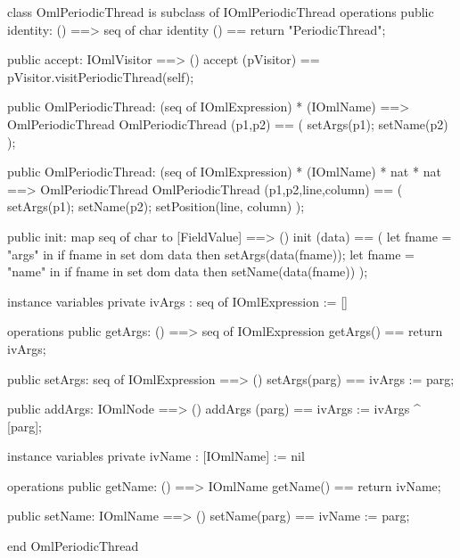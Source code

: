 \begin{vdm_al}
class OmlPeriodicThread is subclass of IOmlPeriodicThread
operations
  public identity: () ==> seq of char
  identity () == return "PeriodicThread";

  public accept: IOmlVisitor ==> ()
  accept (pVisitor) == pVisitor.visitPeriodicThread(self);

  public OmlPeriodicThread:
    (seq of IOmlExpression) *
    (IOmlName) ==> OmlPeriodicThread
  OmlPeriodicThread (p1,p2) == 
    ( setArgs(p1);
      setName(p2) );

  public OmlPeriodicThread:
    (seq of IOmlExpression) *
    (IOmlName) *
    nat *
    nat ==> OmlPeriodicThread
  OmlPeriodicThread (p1,p2,line,column) == 
    ( setArgs(p1);
      setName(p2);
      setPosition(line, column) );

  public init: map seq of char to [FieldValue] ==> ()
  init (data) ==
    ( let fname = "args" in
        if fname in set dom data
        then setArgs(data(fname));
      let fname = "name" in
        if fname in set dom data
        then setName(data(fname)) );

instance variables
  private ivArgs : seq of IOmlExpression := []

operations
  public getArgs: () ==> seq of IOmlExpression
  getArgs() == return ivArgs;

  public setArgs: seq of IOmlExpression ==> ()
  setArgs(parg) == ivArgs := parg;

  public addArgs: IOmlNode ==> ()
  addArgs (parg) == ivArgs := ivArgs ^ [parg];

instance variables
  private ivName : [IOmlName] := nil

operations
  public getName: () ==> IOmlName
  getName() == return ivName;

  public setName: IOmlName ==> ()
  setName(parg) == ivName := parg;

end OmlPeriodicThread
\end{vdm_al}

